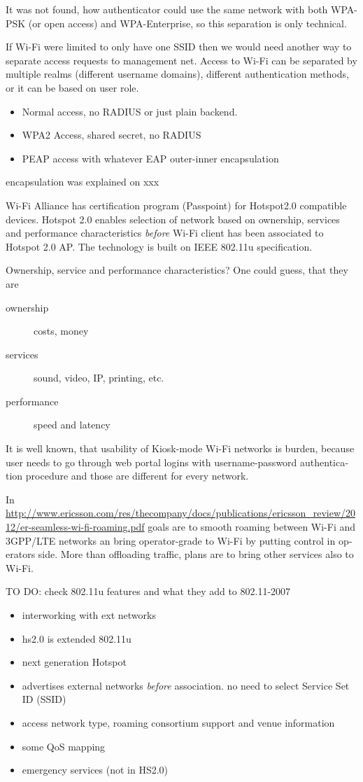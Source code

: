 \documentclass[12pt,a4paper,english]{tutthesis}
\begin{document}
\begin{otherlanguage}{english}
It was not found, how authenticator could use the same network with
both WPA-PSK (or open access) and WPA-Enterprise, so
this separation is only technical.


If Wi-Fi were limited to only have one SSID then we would need another way
to separate access requests to management net.  Access to Wi-Fi can be
separated by multiple realms (different username domains), different
authentication methods, or it can be based on user role.
\begin{itemize}
\item Normal access, no RADIUS or just plain backend.
\item WPA2 Access, shared secret, no RADIUS
\item PEAP access with whatever EAP outer-inner encapsulation
\end{itemize}
encapsulation was explained on xxx





Wi-Fi Alliance has certification program (Passpoint) for Hotspot2.0 compatible
devices.  Hotspot 2.0 enables selection of network based on ownership,
services and performance characteristics \emph{before} Wi-Fi client has
been associated to Hotspot 2.0 AP. The technology is built on
IEEE 802.11u specification.


Ownership, service and performance characteristics?
One could guess, that they are
\begin{description}
\item[{ownership}] costs, money
\item[{services}] sound, video, IP, printing, etc.
\item[{performance}] speed and latency
\end{description}

It is well known, that usability of Kiosk-mode Wi-Fi
 networks is burden, because user needs to go through 
web portal logins with username-password authentication 
procedure and those are different for every network.

In 
\url{http://www.ericsson.com/res/thecompany/docs/publications/ericsson_review/2012/er-seamless-wi-fi-roaming.pdf}
goals are to smooth roaming between Wi-Fi and 3GPP/LTE networks
an bring operator-grade to Wi-Fi by putting control in operators side. More
than offloading traffic, plans are to bring other services also to Wi-Fi.

TO DO: check 802.11u features and what they add to 802.11-2007
\begin{itemize}
\item interworking with ext networks
\item hs2.0 is extended 802.11u
\item next generation Hotspot
\item advertises external networks \emph{before} association. no need to
select Service Set ID (SSID)
\item access network type, roaming consortium support and venue information
\item some QoS mapping
\item emergency services (not in HS2.0)
\end{itemize}



\end{otherlanguage}
\end{document}
